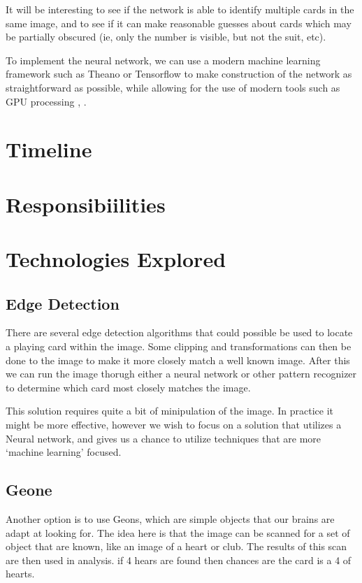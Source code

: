 \documentclass{article}
\begin{document}
It will be interesting to see if the network is able to identify multiple cards in the same image, and to see if it can make reasonable guesses about cards which may be partially obscured (ie, only the number is visible, but not the suit, etc).

To implement the neural network, we can use a modern machine learning framework such as Theano or Tensorflow to make construction of the network as straightforward as possible, while allowing for the use of modern tools such as GPU processing \cite{gpu2}, \cite{gpu}.

\section{Timeline}

\section{Responsibiilities}

\section{Technologies Explored}

\subsection{Edge Detection}
There are several edge detection algorithms that could possible be used to locate a playing card within the image.  Some clipping and transformations can then be done to the image to make it more closely match a well known image.  After this we can run the image thorugh either a neural network or other pattern recognizer to determine which card most closely matches the image.

This solution requires quite a bit of minipulation of the image.  In practice it might be more effective, however we wish to focus on a solution that utilizes a Neural network, and gives us a chance to utilize techniques that are more `machine learning' focused.


\subsection{Geone}
Another option is to use Geons, which are simple objects that our brains are adapt at looking for.  The idea here is that the image can be scanned for a set of object that are known, like an image of a heart or club.  The results of this scan are then used in analysis.  if 4 hears are found then chances are the card is a 4 of hearts.
\end{document}
